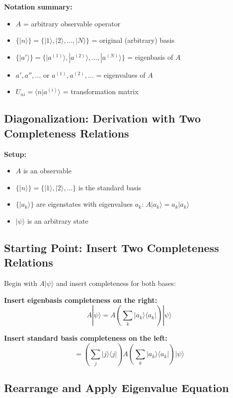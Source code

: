 \documentclass[11pt,a4paper]{article}
\begin{document}
\textbf{Notation summary:}
\begin{itemize}
\item $A$ = arbitrary observable operator
\item $\{|n\rangle\} = \{|1\rangle, |2\rangle, \ldots, |N\rangle\}$ = original (arbitrary) basis
\item $\{|a'\rangle\} = \{|a^{(1)}\rangle, |a^{(2)}\rangle, \ldots, |a^{(N)}\rangle\}$ = eigenbasis of $A$
\item $a', a'', \ldots$ or $a^{(1)}, a^{(2)}, \ldots$ = eigenvalues of $A$
\item $U_{ni} = \langle n|a^{(i)}\rangle$ = transformation matrix
\end{itemize}

\newpage
\subsection*{Diagonalization: Derivation with Two Completeness Relations}

\textbf{Setup:}
\begin{itemize}
\item $A$ is an observable
\item $\{|n\rangle\} = \{|1\rangle, |2\rangle, \ldots\}$ is the standard basis
\item $\{|a_k\rangle\}$ are eigenstates with eigenvalues $a_k$: $A|a_k\rangle = a_k|a_k\rangle$
\item $|\psi\rangle$ is an arbitrary state
\end{itemize}

\subsection*{Starting Point: Insert Two Completeness Relations}

Begin with $A|\psi\rangle$ and insert completeness for both bases:

\textbf{Insert eigenbasis completeness on the right:}
$$A|\psi\rangle = A \left(\sum_k |a_k\rangle\langle a_k|\right) |\psi\rangle$$

\textbf{Insert standard basis completeness on the left:}
$$= \left(\sum_j |j\rangle\langle j|\right) A \left(\sum_k |a_k\rangle\langle a_k|\right) |\psi\rangle$$

\subsection*{Rearrange and Apply Eigenvalue Equation}
\end{document}
